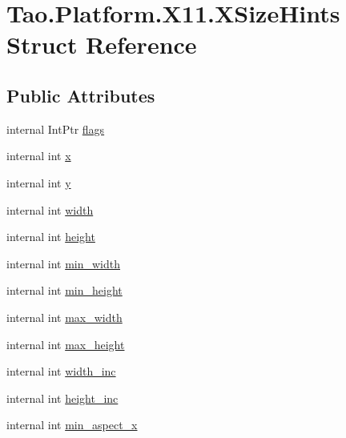 \hypertarget{struct_tao_1_1_platform_1_1_x11_1_1_x_size_hints}{
\section{Tao.Platform.X11.XSizeHints Struct Reference}
\label{struct_tao_1_1_platform_1_1_x11_1_1_x_size_hints}
}
\subsection*{Public Attributes}
\begin{DoxyCompactItemize}
\item 
internal IntPtr \hyperlink{struct_tao_1_1_platform_1_1_x11_1_1_x_size_hints_a39cb883268496bbfb86d06a52f928443}{flags}
\item 
internal int \hyperlink{struct_tao_1_1_platform_1_1_x11_1_1_x_size_hints_ac5d067557c51f2bf324d1b9028f5eff2}{x}
\item 
internal int \hyperlink{struct_tao_1_1_platform_1_1_x11_1_1_x_size_hints_aa6934c8f66e612c9a70a49dbbd811d4b}{y}
\item 
internal int \hyperlink{struct_tao_1_1_platform_1_1_x11_1_1_x_size_hints_afebe4f5b3182f3015e3c59c6ae703e32}{width}
\item 
internal int \hyperlink{struct_tao_1_1_platform_1_1_x11_1_1_x_size_hints_a4d90b6c3ae85887cb0e4804124a4479f}{height}
\item 
internal int \hyperlink{struct_tao_1_1_platform_1_1_x11_1_1_x_size_hints_a578096a53420f255f890ceec291cde6b}{min\_\-width}
\item 
internal int \hyperlink{struct_tao_1_1_platform_1_1_x11_1_1_x_size_hints_af3220948c074f100e60a19d1f137f50c}{min\_\-height}
\item 
internal int \hyperlink{struct_tao_1_1_platform_1_1_x11_1_1_x_size_hints_aa07efe337b5dd74709d4d54b333d8d35}{max\_\-width}
\item 
internal int \hyperlink{struct_tao_1_1_platform_1_1_x11_1_1_x_size_hints_a6fff7b1b4f33f3faf12088c128456053}{max\_\-height}
\item 
internal int \hyperlink{struct_tao_1_1_platform_1_1_x11_1_1_x_size_hints_a7de49a43e5b77ed38c590e8a32167dd2}{width\_\-inc}
\item 
internal int \hyperlink{struct_tao_1_1_platform_1_1_x11_1_1_x_size_hints_aff93780610bf5a77d187a06423d4c951}{height\_\-inc}
\item 
internal int \hyperlink{struct_tao_1_1_platform_1_1_x11_1_1_x_size_hints_af5d3a0a90d797dfa4641be1935b3803c}{min\_\-aspect\_\-x}

\end{DoxyCompactItemize}

